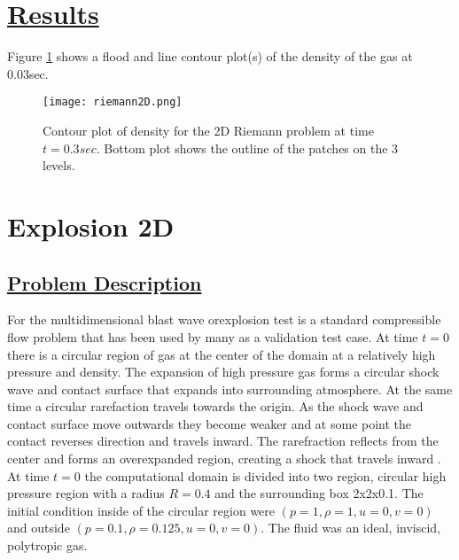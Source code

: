 \section*{\underline{Results}}
Figure \ref{fig:riemann2D} shows a flood and line contour plot(s) of the density of the gas at 0.03sec.
\begin{figure}
  \texttt{[image: riemann2D.png]}
  \caption{Contour plot of density for the 2D Riemann problem at time $t = 0.3sec$.  Bottom plot shows the outline of the patches on the 3 levels.}
  \label{fig:riemann2D}
  \end{figure}
\newpage


\section*{\center Explosion 2D}
\subsection*{\underline{Problem Description}}
For the multidimensional blast wave orexplosion test is a standard compressible
flow problem that has been used by many as a validation test case.  At time
$t=0$ there is a circular region of gas at the center of the domain at a
relatively high pressure and density.  The expansion of high pressure gas
forms a circular shock wave and contact surface that expands into surrounding
atmosphere.  At the same time a circular rarefaction travels towards the
origin.  As the shock wave and contact surface move outwards they become
weaker and at some point the contact reverses direction and travels inward.
The rarefraction reflects from the center and forms an overexpanded region,
creating a shock that travels inward \cite{ref:toro}.  At time $t=0$ the
computational domain is divided into two region, circular high pressure region
with a radius $R=0.4$ and the surrounding box 2x2x0.1.  The initial condition
inside of the circular region were $(p=1, \rho=1, u=0, v=0)$  and outside
$(p=0.1, \rho=0.125, u=0, v=0).$  The fluid was an ideal, inviscid, polytropic gas.
%
